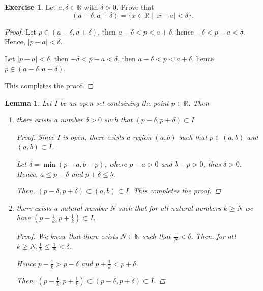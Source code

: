\documentclass[11pt]{article}
\newcommand{\bbN}{\mathbb{N}}
\newcommand{\bbR}{\mathbb{R}}
\newcommand{\abs}[1]{\lvert #1 \rvert}
\newtheorem{lemma}[theorem]{Lemma}
\theoremstyle{definition}
\newtheorem{exercise}[theorem]{Exercise}
\numberwithin{equation}{section}
\begin{document}
\begin{exercise}
	Let $a, \delta \in \bbR$ with $\delta > 0$. Prove that
	\[
	(a - \delta, a + \delta) = \{x \in \mathbb{R} \mid \abs{x - a} < \delta \}.
	\]


\begin{proof}
Let $p \in (a - \delta, a + \delta)$, then $a - \delta <p< a + \delta$, hence $- \delta <p-a< \delta$. Hence, $|p-a|<\delta$. 

Let $|p-a|<\delta$, then $- \delta <p-a< \delta$, then $a - \delta <p< a + \delta$, hence $p \in (a - \delta, a + \delta)$.

This completes the proof.


\renewcommand\qedsymbol{QED}
\end{proof}

\end{exercise}

\begin{lemma}
	Let $I$ be an open set containing the point $p \in \bbR$. Then
\begin{enumerate}
\item[i)] there exists a number $\delta > 0$ such that $(p - \delta, p + \delta) \subset I$
\begin{proof}
Since $I$ is open, there exists a region $(a,b)$ such that $p \in (a,b)$ and $(a,b) \subset I$. 

Let $\delta = \min(p-a,b-p)$, where $p-a>0$ and $b-p>0$, thus $\delta>0$. Hence, $a\leq p-\delta$ and $p+\delta \leq b$.

Then, $(p-\delta, p+\delta)\subset (a,b) \subset I$. This completes the proof.


\renewcommand\qedsymbol{QED}
\end{proof}
\item[ii)]  there exists a natural number $N$ such that for all natural numbers $k \geq N$ we have $(p - \frac1k, p + \frac1k) \subset I$.
\begin{proof}
We know that there exists $N \in \bbN$ such that $\frac{1}{N}<\delta$. Then, for all $k\geq N, \frac{1}{k}\leq \frac{1}{N}< \delta$. 

Hence $p-\frac{1}{k}>p-\delta$ and $p+\frac{1}{k}<p+\delta$. 

Then, $(p-\frac{1}{k}, p+\frac{1}{k})\subset (p-\delta, p+\delta) \subset I$. 


\renewcommand\qedsymbol{QED}
\end{proof}
\end{enumerate}
\end{lemma}
\end{document}
